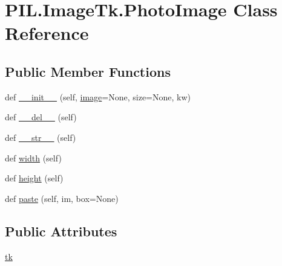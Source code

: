 \hypertarget{classPIL_1_1ImageTk_1_1PhotoImage}{}\section{P\+I\+L.\+Image\+Tk.\+Photo\+Image Class Reference}
\label{classPIL_1_1ImageTk_1_1PhotoImage}
\subsection*{Public Member Functions}
\begin{DoxyCompactItemize}
\item 
def \hyperlink{classPIL_1_1ImageTk_1_1PhotoImage_aad15cc3e51d014a485fc088bbacddaf5}{\+\_\+\+\_\+init\+\_\+\+\_\+} (self, \hyperlink{namespacePIL_1_1ImageTk_aa639552cd8cb63f42e281f4f5358ed5f}{image}=None, size=None, kw)
\item 
def \hyperlink{classPIL_1_1ImageTk_1_1PhotoImage_a62f893638298c86adab8ec5f42243c79}{\+\_\+\+\_\+del\+\_\+\+\_\+} (self)
\item 
def \hyperlink{classPIL_1_1ImageTk_1_1PhotoImage_a4cbe34ab3bbdfc4f4b76c469127b1c58}{\+\_\+\+\_\+str\+\_\+\+\_\+} (self)
\item 
def \hyperlink{classPIL_1_1ImageTk_1_1PhotoImage_aa746655808ee6dff1c2480f962262c75}{width} (self)
\item 
def \hyperlink{classPIL_1_1ImageTk_1_1PhotoImage_a0fc84f459244956308cbf86403a9afce}{height} (self)
\item 
def \hyperlink{classPIL_1_1ImageTk_1_1PhotoImage_a892073f80f69cc2318c610ec96784b05}{paste} (self, im, box=None)
\end{DoxyCompactItemize}
\subsection*{Public Attributes}
\begin{DoxyCompactItemize}
\item 
\hyperlink{classPIL_1_1ImageTk_1_1PhotoImage_a5c6c5db294abea511bffc966dbae4e74}{tk}
\end{DoxyCompactItemize}



